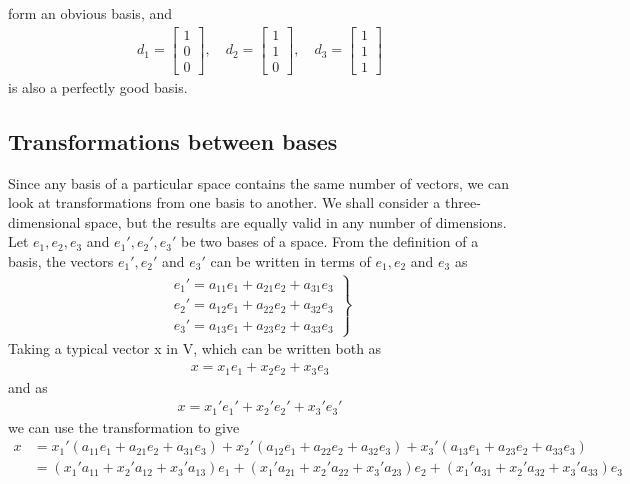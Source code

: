 \documentclass[12pt,a4paper,fleqn]{mycalc}
\begin{document}
	form an obvious basis, and
	\begin{align*}
	d_1=\begin{bmatrix}
	1\\
	0\\
	0
	\end{bmatrix},\quad
	d_2=\begin{bmatrix}
	1\\
	1\\
	0
	\end{bmatrix},\quad
	d_3=\begin{bmatrix}
	1\\
	1\\
	1
	\end{bmatrix}
	\end{align*}
	is also a perfectly good basis. 
	\subsection{Transformations between bases}
	Since any basis of a particular space contains the same number of vectors, we can look at transformations from one basis to another. We shall consider a three-dimensional space, but the results are equally valid in any number of dimensions. Let $ e_1, e_2, e_3 $ and $ e_1', e_2', e_3' $ be two bases of a space. From the definition of a basis, the vectors $ e_1', e_2' $ and $ e_3' $ can be written in terms of $ e_1, e_2 $ and $ e_3 $ as
	\begin{align*}
	\left.
	\begin{matrix}
	e_1'=a_{11}e_1+a_{21}e_2+a_{31}e_3\\
	e_2'=a_{12}e_1+a_{22}e_2+a_{32}e_3\\
	e_3'=a_{13}e_1+a_{23}e_2+a_{33}e_3
	\end{matrix}
	\right\}
	\end{align*}
	Taking a typical vector x in V, which can be written both as
	\begin{align*}
	x=x_{1}e_1+x_{2}e_2+x_{3}e_3
	\end{align*}
	and as
	\begin{align*}
	x=x_{1}'e_1'+x_{2}'e_2'+x_{3}'e_3'
	\end{align*}
	we can use the transformation to give
	\begin{align*}
	x &= x_1'(a_{11}e_1 + a_{21}e_2 + a_{31}e_3) + x_2'(a_{12}e_1 + a_{22}e_2 + a_{32}e_3) + x_3'(a_{13}e_1 + a_{23}e_2 + a_{33}e_3)\\
	&= (x_1'a_{11} + x_2'a_{12} + x_3'a_{13})e_1 + (x_1'a_{21} + x_2'a_{22} + x_3'a_{23})e_2 + (x_1'a_{31} + x_2'a_{32} + x_3'a_{33})e_3
	\end{align*}
\end{document}
